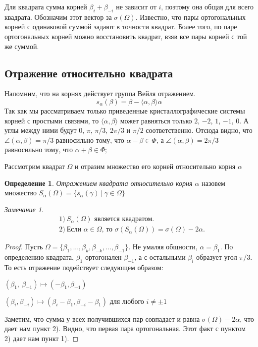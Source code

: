 \documentclass[a4paper,12pt]{amsart}
\theoremstyle{plain}
\theoremstyle{remark}
\newtheorem{remark}{Замечание}
\theoremstyle{definition}
\newtheorem{definition}{Определение}
\begin{document}
Для квадрата сумма корней $\beta_i + \beta_{-i}$ не зависит от $i$, поэтому она общая для всего квадрата. Обозначим этот вектор за $\sigma(\Omega)$. Известно, что пары ортогональных корней с одинаковой суммой задают в точности квадрат.
Более того, по паре ортогональных корней можно восстановить квадрат, взяв все пары корней с той же суммой.

\subsection{Отражение относительно квадрата}
Напомним, что на корнях действует группа Вейля отражением.
$$s_{\alpha}(\beta) = \beta - \langle\alpha,\beta\rangle\alpha$$ 
Так как мы рассматриваем только приведенные кристаллографические системы корней с простыми связями, то $\langle\alpha,\beta\rangle$ может равняться только $2$, $-2$, $1$, $-1$, $0$. А углы между ними будут $0$, $\pi$, $\pi/3$, $2\pi/3$ и $\pi/2$ соответственно. Отсюда видно, что $\angle(\alpha,\beta)=\pi/3$ равносильно тому, что $\alpha-\beta \in \Phi$, а $\angle(\alpha,\beta)=2\pi/3$ равносильно тому, что $\alpha+\beta \in \Phi;$

Рассмотрим квадрат $\Omega$ и отразим множество его корней относительно корня $\alpha$

\begin{definition}
\emph{Отражением квадрата относительно корня $\alpha$} назовем множество $S_{\alpha}(\Omega)=\{s_{\alpha}(\gamma) ~|~ \gamma\in\Omega\}$
\end{definition}

\begin{remark}
\begin{align*}
 &
 1)~ S_{\alpha}(\Omega) \text{ является квадратом.}
\\ &
 2)~ \text{Если } \alpha \in \Omega \text{, то } \sigma(S_{\alpha}(\Omega))=\sigma(\Omega)-2\alpha.
\end{align*}
\end{remark}
\begin{proof}
Пусть $\Omega = \{\beta_1,...,\beta_k, \beta_{-k},...,\beta_{-1}\}$.
Не умаляя общности, $\alpha=\beta_1$. По определению квадрата, $\beta_1$ ортогонален $\beta_{-1}$, а с остальными $\beta_{i}$ образует угол $\pi/3$. То есть отражение подействует следующем образом:
\begin{center}
  $(\beta_1, \ \beta_{-1})\mapsto (-\beta_1, \beta_{-1})$

  $(\beta_i, \beta_{-i})\mapsto (\beta_i-\beta_1, \beta_{-i}-\beta_{1}) \text{ для любого } i\neq\pm1$
\end{center}
Заметим, что сумма у всех получившихся пар совпадает и равна $\sigma(\Omega)-2\alpha$, что дает нам пункт 2). Видно, что первая пара ортогональная. Этот факт с пунктом 2) дает нам пункт 1).
\end{proof}
\end{document}
